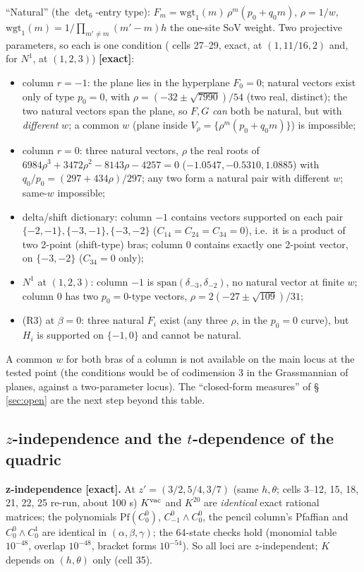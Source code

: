 \documentclass[10pt]{article}
\newcommand{\nb}[1]{\texttt{\path{#1}}}
\newcommand{\nbA}{\nb{L2-210-site1-rotation-brackets.wb}}
\newcommand{\Pf}{\mathrm{Pf}}
\begin{document}
``Natural'' (the $\det_6$-entry type): $F_m=\mathrm{wgt}_1(m)\,\rho^m(p_0+q_0m)$, $\rho=1/w$, $\mathrm{wgt}_1(m)=1/\prod_{m'\neq m}(m'-m)h$ the one-site SoV weight. Two projective parameters, so each is one condition (\nbA{} cells 27--29, exact, at $(1,11/16,2)$ and, for $N^1$, at $(1,2,3)$) \textbf{[exact]}:
\begin{itemize}\setlength{\itemsep}{1pt}
\item column $r=-1$: the plane lies in the hyperplane $F_0=0$; natural vectors exist only of type $p_0=0$, with $\rho=(-32\pm\sqrt{7990})/54$ (two real, distinct); the two natural vectors span the plane, so $F,G$ \emph{can} both be natural, but with \emph{different} $w$; a common $w$ (plane inside $V_\rho=\{\rho^m(p_0+q_0m)\}$) is impossible;
\item column $r=0$: three natural vectors, $\rho$ the real roots of $6984\rho^3+3472\rho^2-8143\rho-4257=0$ ($-1.0547,-0.5310,1.0885$) with $q_0/p_0=(297+434\rho)/297$; any two form a natural pair with different $w$; same-$w$ impossible;
\item delta/shift dictionary: column $-1$ contains vectors supported on each pair $\{-2,-1\},\{-3,-1\},\{-3,-2\}$ ($C_{14}=C_{24}=C_{34}=0$), i.e.\ it is a product of two 2-point (shift-type) bras; column $0$ contains exactly one 2-point vector, on $\{-3,-2\}$ ($C_{34}=0$ only);
\item $N^1$ at $(1,2,3)$: column $-1$ is $\mathrm{span}(\delta_{-3},\delta_{-2})$, no natural vector at finite $w$; column $0$ has two $p_0=0$-type vectors, $\rho=2(-27\pm\sqrt{109})/31$;
\item (R3) at $\beta=0$: three natural $F_i$ exist (any three $\rho$, in the $p_0=0$ curve), but $H_i$ is supported on $\{-1,0\}$ and cannot be natural.
\end{itemize}
A common $w$ for both bras of a column is not available on the main locus at the tested point (the conditions would be of codimension 3 in the Grassmannian of planes, against a two-parameter locus). The ``closed-form measures'' of \S\,\ref{sec:open} are the next step beyond this table.

\subsection{$z$-independence and the $t$-dependence of the quadric}\label{sec:adjt}

\textbf{z-independence [exact].} At $z'=(3/2,5/4,3/7)$ (same $h,\theta$; cells 3--12, 15, 18, 21, 22, 25 re-run, about 100 s) $K^{\rm vac}$ and $K^{20}$ are \emph{identical} exact rational matrices; the polynomials $\Pf(C^0_0)$, $C^0_{-1}\wedge C^0_0$, the pencil column's Pfaffian and $C^0_0\wedge C^1_0$ are identical in $(\alpha,\beta,\gamma)$; the 64-state checks hold (monomial table $10^{-48}$, overlap $10^{-48}$, bracket forms $10^{-54}$). So all loci are $z$-independent; $K$ depends on $(h,\theta)$ only (cell 35).
\end{document}
